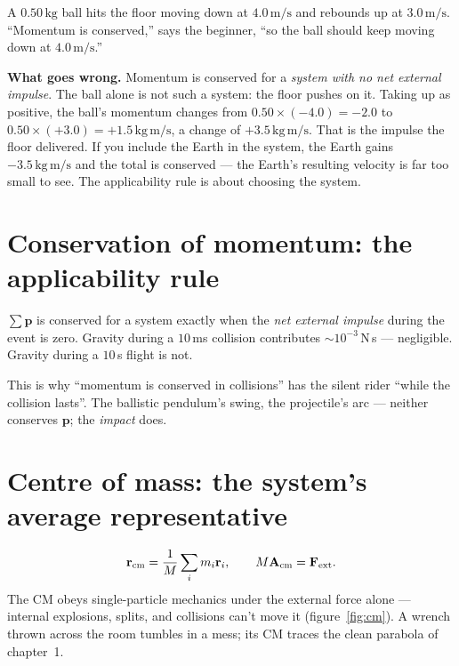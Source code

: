 \begin{example}\label{ex:naive-floor}
A $0.50\,\mathrm{kg}$ ball hits the floor moving down at $4.0\,\mathrm{m/s}$ and rebounds up at $3.0\,\mathrm{m/s}$.
``Momentum is conserved,'' says the beginner, ``so the ball should keep moving down at $4.0\,\mathrm{m/s}$.''
\par\smallskip
\textbf{What goes wrong.} Momentum is conserved for a \emph{system with no net external impulse}. The ball alone is
not such a system: the floor pushes on it. Taking up as positive, the ball's momentum changes from
$0.50\times(-4.0)=-2.0$ to $0.50\times(+3.0)=+1.5\,\mathrm{kg\,m/s}$, a change of $+3.5\,\mathrm{kg\,m/s}$. That is the impulse
the floor delivered. If you include the Earth in the system, the Earth gains $-3.5\,\mathrm{kg\,m/s}$ and the total is
conserved --- the Earth's resulting velocity is far too small to see. The applicability rule is about choosing the system.
\end{example}

\section{Conservation of momentum: the applicability rule}\label{sec:mom-cons}

\begin{principle}
$\sum\mathbf p$ is conserved for a system exactly when the \emph{net
external impulse} during the event is zero. Gravity during a $10$\,ms
collision contributes $\sim10^{-3}$\,N\,s --- negligible. Gravity during a
$10$\,s flight is not.
\end{principle}

This is why ``momentum is conserved in collisions'' has the silent rider
``while the collision lasts''. The ballistic pendulum's swing, the
projectile's arc --- neither conserves $\mathbf p$; the \emph{impact} does.

\section{Centre of mass: the system's average representative}\label{sec:mom-cm}

\[
  \mathbf r_{\rm cm}=\frac{1}{M}\sum_i m_i\mathbf r_i,\qquad
  M\mathbf A_{\rm cm}=\mathbf F_{\rm ext}.
\]
The CM obeys single-particle mechanics under the
external force alone --- internal explosions, splits, and collisions can't
move it (figure~\ref{fig:cm}). A wrench thrown across the room tumbles in
a mess; its CM traces the clean parabola of chapter~1.

